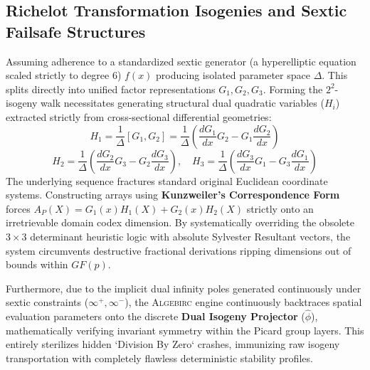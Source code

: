 \subsection{Richelot Transformation Isogenies and Sextic Failsafe Structures}
Assuming adherence to a standardized sextic generator (a hyperelliptic equation scaled strictly to degree 6) $f(x)$ producing isolated parameter space $\Delta$. This splits directly into unified factor representations $G_1, G_2, G_3$. Forming the $2^2$-isogeny walk necessitates generating structural dual quadratic variables ($H_i$) extracted strictly from cross-sectional differential geometries:
\begin{equation}
    H_1 = \frac{1}{\Delta} [G_1, G_2] = \frac{1}{\Delta} \left( \frac{d G_1}{dx} G_2 - G_1 \frac{d G_2}{dx} \right)
\end{equation}
\begin{equation}
    H_2 = \frac{1}{\Delta} \left( \frac{d G_2}{dx} G_3 - G_2 \frac{d G_3}{dx} \right), \quad 
    H_3 = \frac{1}{\Delta} \left( \frac{d G_3}{dx} G_1 - G_3 \frac{d G_1}{dx} \right)
\end{equation}
The underlying sequence fractures standard original Euclidean coordinate systems. Constructing arrays using \textbf{Kunzweiler's Correspondence Form} forces $A_P(X) = G_1(x)H_1(X) + G_2(x)H_2(X)$ strictly onto an irretrievable domain codex dimension. By systematically overriding the obsolete $3\times3$ determinant heuristic logic with absolute Sylvester Resultant vectors, the system circumvents destructive fractional derivations ripping dimensions out of bounds within $GF(p)$.

Furthermore, due to the implicit dual infinity poles generated continuously under sextic constraints ($\infty^+, \infty^-$), the \textsc{Algebirc} engine continuously backtraces spatial evaluation parameters onto the discrete \textbf{Dual Isogeny Projector} ($\hat{\phi}$), mathematically verifying invariant symmetry within the Picard group layers. This entirely sterilizes hidden `Division By Zero` crashes, immunizing raw isogeny transportation with completely flawless deterministic stability profiles.
